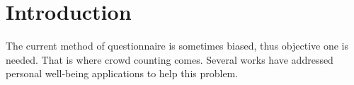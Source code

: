 \chapter{Introduction}\label{ch:introduction}





The current method of questionnaire is sometimes biased, thus objective one is needed. That is where crowd counting comes. Several works have addressed personal well-being applications to help this problem.

